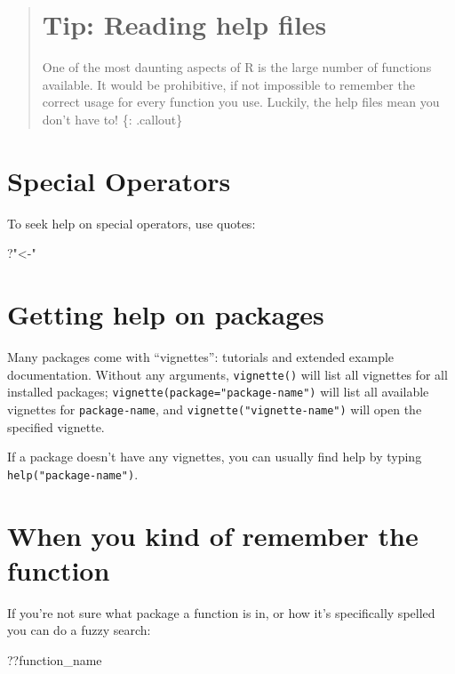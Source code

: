 \documentclass[]{book}
\newenvironment{Shaded}{\begin{snugshade}}{\end{snugshade}}
\newcommand{\StringTok}[1]{\textcolor[rgb]{0.31,0.60,0.02}{#1}}
\newcommand{\NormalTok}[1]{#1}
\begin{document}
\begin{quote}
\section{Tip: Reading help files}\label{tip-reading-help-files}

One of the most daunting aspects of R is the large number of functions
available. It would be prohibitive, if not impossible to remember the
correct usage for every function you use. Luckily, the help files mean
you don't have to! \{: .callout\}
\end{quote}

\section{Special Operators}\label{special-operators}

To seek help on special operators, use quotes:

\begin{Shaded}
\begin{Highlighting}[]
\NormalTok{?}\StringTok{"<-"}
\end{Highlighting}
\end{Shaded}

\section{Getting help on packages}\label{getting-help-on-packages}

Many packages come with ``vignettes'': tutorials and extended example
documentation. Without any arguments, \texttt{vignette()} will list all
vignettes for all installed packages;
\texttt{vignette(package="package-name")} will list all available
vignettes for \texttt{package-name}, and
\texttt{vignette("vignette-name")} will open the specified vignette.

If a package doesn't have any vignettes, you can usually find help by
typing \texttt{help("package-name")}.

\section{When you kind of remember the
function}\label{when-you-kind-of-remember-the-function}

If you're not sure what package a function is in, or how it's
specifically spelled you can do a fuzzy search:

\begin{Shaded}
\begin{Highlighting}[]
\NormalTok{??function_name}
\end{Highlighting}
\end{Shaded}
\end{document}
